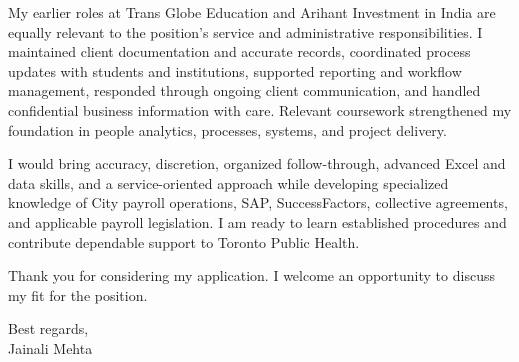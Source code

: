 \documentclass[letterpaper,10pt]{article}
\begin{document}
My earlier roles at Trans Globe Education and Arihant Investment in India are equally relevant to the position's service and administrative responsibilities. I maintained client documentation and accurate records, coordinated process updates with students and institutions, supported reporting and workflow management, responded through ongoing client communication, and handled confidential business information with care. Relevant coursework strengthened my foundation in people analytics, processes, systems, and project delivery.

I would bring accuracy, discretion, organized follow-through, advanced Excel and data skills, and a service-oriented approach while developing specialized knowledge of City payroll operations, SAP, SuccessFactors, collective agreements, and applicable payroll legislation. I am ready to learn established procedures and contribute dependable support to Toronto Public Health.

Thank you for considering my application. I welcome an opportunity to discuss my fit for the position.

Best regards,\\[8pt]
Jainali Mehta
\end{document}

